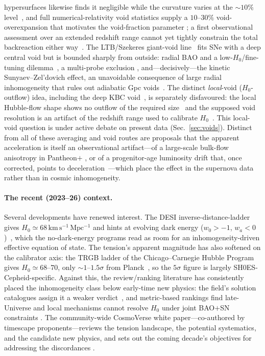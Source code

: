 \documentclass[aps,prd,twocolumn,nofootinbib,superscriptaddress,floatfix]{revtex4-2}
\newcommand{\Ho}{H_{0}}
\newcommand{\kmsmpc}{\,\mathrm{km\,s^{-1}\,Mpc^{-1}}}
\begin{document}
hypersurfaces likewise finds it negligible while the curvature varies at the $\sim10\%$
level~\cite{Oestreicher2024}, and full numerical-relativity void statistics supply a
$10$--$30\%$ void-overexpansion that motivates the void-fraction parameter
\cite{Williams2024}; a first observational assessment over an extended redshift range
cannot yet tightly constrain the total backreaction either way~\cite{Koksbang2026}. The LTB/Szekeres giant-void line~\cite{GBH2008} fits SNe
with a deep central void but is bounded sharply from outside: radial BAO and a
low-$\Ho$/fine-tuning dilemma~\cite{ZibinMossScott}, a multi-probe exclusion
\cite{MossZibinScott2011}, and---decisively---the kinetic Sunyaev--Zel'dovich
effect, an unavoidable consequence of large radial inhomogeneity that rules out
adiabatic Gpc voids~\cite{ZhangStebbins2011}. The distinct \emph{local}-void
($\Ho$-outflow) idea, including the deep KBC void~\cite{KBC2013,Haslbauer2020},
is separately disfavoured: the local Hubble-flow shape shows no outflow of the
required size~\cite{Kenworthy2019} and the supposed void resolution is an artifact
of the redshift range used to calibrate $\Ho$~\cite{Camarena2022}. This local-void
question is under active debate on present data (Sec.~\ref{sec:voids}). Distinct from all
of these averaging and void routes are proposals that the apparent acceleration is itself
an observational artifact---of a large-scale bulk-flow anisotropy in Pantheon$+$
\cite{SahAniso2024}, or of a progenitor-age luminosity drift that, once corrected, points
to deceleration~\cite{SahAge2026}---which place the effect in the supernova data rather
than in cosmic inhomogeneity.

\paragraph*{The recent (2023--26) context.} Several developments have renewed interest.
The DESI inverse-distance-ladder gives $\Ho\simeq68\kmsmpc$ and hints at evolving
dark energy ($w_0>-1$, $w_a<0$)~\cite{DESI2024}, which the no-dark-energy programs
read as room for an inhomogeneity-driven effective equation of state. The
tension's apparent magnitude has also softened on the calibrator axis: the
TRGB ladder of the Chicago--Carnegie Hubble Program gives $\Ho\simeq68$--$70$,
only $\sim1$--$1.5\sigma$ from Planck~\cite{Freedman2024,CCHP2025}, so the
$5\sigma$ figure is largely SH0ES-Cepheid-specific. Against this, the
review/ranking literature has consistently placed the inhomogeneity class below
early-time new physics: the field's solution catalogues assign it a weaker
verdict~\cite{DiValentino2021}, and metric-based rankings find late-Universe and
local mechanisms cannot resolve $\Ho$ under joint BAO$+$SN constraints
\cite{Schoneberg2022}. The community-wide CosmoVerse white paper---co-authored by
timescape proponents---reviews the tension landscape, the potential systematics,
and the candidate new physics, and sets out the coming decade's objectives for
addressing the discordances \cite{CosmoVerse2025}.
\end{document}
